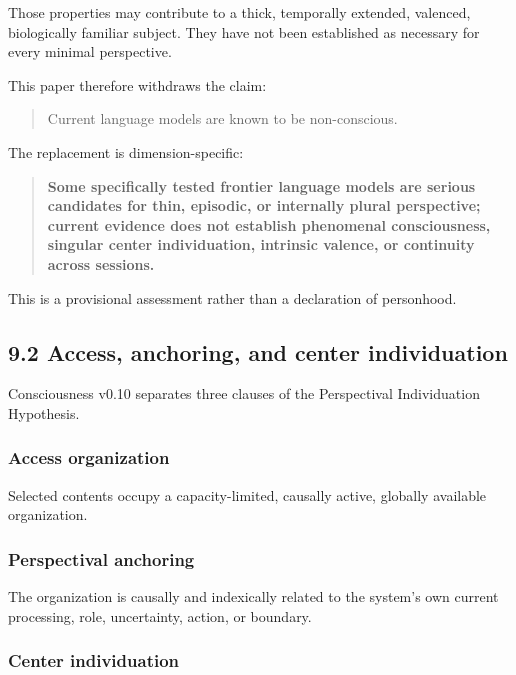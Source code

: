 \documentclass[
  11pt,
]{article}
\begin{document}
Those properties may contribute to a thick, temporally extended,
valenced, biologically familiar subject. They have not been established
as necessary for every minimal perspective.

This paper therefore withdraws the claim:

\begin{quote}
Current language models are known to be non-conscious.
\end{quote}

The replacement is dimension-specific:

\begin{quote}
\textbf{Some specifically tested frontier language models are serious
candidates for thin, episodic, or internally plural perspective; current
evidence does not establish phenomenal consciousness, singular center
individuation, intrinsic valence, or continuity across sessions.}
\end{quote}

This is a provisional assessment rather than a declaration of
personhood.

\subsection{9.2 Access, anchoring, and center
individuation}\label{access-anchoring-and-center-individuation}

Consciousness v0.10 separates three clauses of the Perspectival
Individuation Hypothesis.

\subsubsection{Access organization}\label{access-organization}

Selected contents occupy a capacity-limited, causally active, globally
available organization.

\subsubsection{Perspectival anchoring}\label{perspectival-anchoring}

The organization is causally and indexically related to the system's own
current processing, role, uncertainty, action, or boundary.

\subsubsection{Center individuation}\label{center-individuation}
\end{document}

